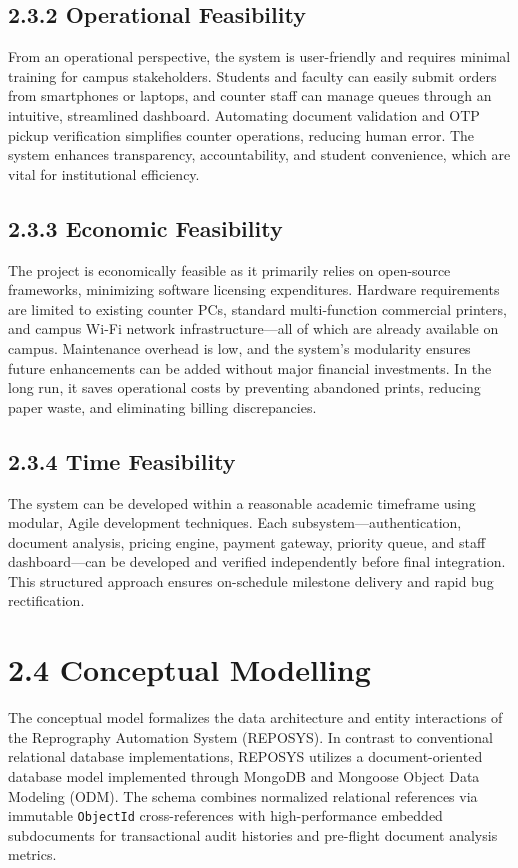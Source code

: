 \documentclass[12pt,a4paper]{report}
\begin{document}
\subsection{2.3.2 Operational Feasibility}
From an operational perspective, the system is user-friendly and requires minimal training for campus stakeholders. Students and faculty can easily submit orders from smartphones or laptops, and counter staff can manage queues through an intuitive, streamlined dashboard. Automating document validation and OTP pickup verification simplifies counter operations, reducing human error. The system enhances transparency, accountability, and student convenience, which are vital for institutional efficiency.

\subsection{2.3.3 Economic Feasibility}
The project is economically feasible as it primarily relies on open-source frameworks, minimizing software licensing expenditures. Hardware requirements are limited to existing counter PCs, standard multi-function commercial printers, and campus Wi-Fi network infrastructure---all of which are already available on campus. Maintenance overhead is low, and the system's modularity ensures future enhancements can be added without major financial investments. In the long run, it saves operational costs by preventing abandoned prints, reducing paper waste, and eliminating billing discrepancies.

\subsection{2.3.4 Time Feasibility}
The system can be developed within a reasonable academic timeframe using modular, Agile development techniques. Each subsystem---authentication, document analysis, pricing engine, payment gateway, priority queue, and staff dashboard---can be developed and verified independently before final integration. This structured approach ensures on-schedule milestone delivery and rapid bug rectification.

\section{2.4 Conceptual Modelling}
The conceptual model formalizes the data architecture and entity interactions of the Reprography Automation System (REPOSYS). In contrast to conventional relational database implementations, REPOSYS utilizes a document-oriented database model implemented through MongoDB and Mongoose Object Data Modeling (ODM). The schema combines normalized relational references via immutable \texttt{ObjectId} cross-references with high-performance embedded subdocuments for transactional audit histories and pre-flight document analysis metrics.
\end{document}
